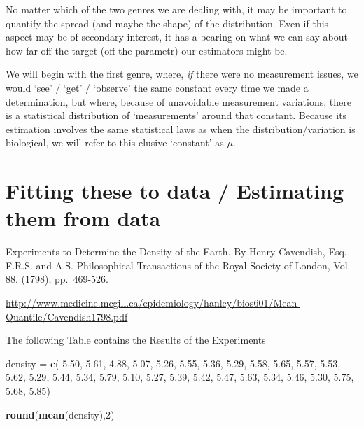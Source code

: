 \documentclass[]{book}
\newenvironment{Shaded}{\begin{snugshade}}{\end{snugshade}}
\newcommand{\DecValTok}[1]{\textcolor[rgb]{0.00,0.00,0.81}{#1}}
\newcommand{\FloatTok}[1]{\textcolor[rgb]{0.00,0.00,0.81}{#1}}
\newcommand{\KeywordTok}[1]{\textcolor[rgb]{0.13,0.29,0.53}{\textbf{#1}}}
\newcommand{\NormalTok}[1]{#1}
\newcommand{\StringTok}[1]{\textcolor[rgb]{0.31,0.60,0.02}{#1}}
\begin{document}
No matter which of the two genres we are dealing with, it may be important to quantify the spread (and maybe the shape) of the distribution. Even if this aspect may be of secondary interest, it has a bearing on what we can say about how far off the target (off the parametr) our estimators might be.

We will begin with the first genre, where, \emph{if} there were no measurement issues, we would `see' / `get' / `observe' the same constant every time we made a determination, but where, because of unavoidable measurement variations, there is a statistical distribution of `measurements' around that constant. Because its estimation involves the same statistical laws as when the distribution/variation is biological, we will refer to this elusive `constant' as \(\mu.\)

\hypertarget{fitting-these-to-data-estimating-them-from-data}{%
\section{Fitting these to data / Estimating them from data}\label{fitting-these-to-data-estimating-them-from-data}}

Experiments to Determine the Density of the Earth. By Henry Cavendish, Esq. F.R.S. and A.S. Philosophical Transactions of the Royal Society of London, Vol. 88. (1798), pp.~469-526.

\url{http://www.medicine.mcgill.ca/epidemiology/hanley/bios601/Mean-Quantile/Cavendish1798.pdf}

The following Table contains the Results of the Experiments

\begin{Shaded}
\begin{Highlighting}[]
\NormalTok{density =}\StringTok{ }\KeywordTok{c}\NormalTok{(}
\FloatTok{5.50}\NormalTok{, }\FloatTok{5.61}\NormalTok{, }\FloatTok{4.88}\NormalTok{, }\FloatTok{5.07}\NormalTok{, }\FloatTok{5.26}\NormalTok{, }\FloatTok{5.55}\NormalTok{, }\FloatTok{5.36}\NormalTok{, }\FloatTok{5.29}\NormalTok{, }\FloatTok{5.58}\NormalTok{, }\FloatTok{5.65}\NormalTok{,}
\FloatTok{5.57}\NormalTok{, }\FloatTok{5.53}\NormalTok{, }\FloatTok{5.62}\NormalTok{, }\FloatTok{5.29}\NormalTok{, }\FloatTok{5.44}\NormalTok{, }\FloatTok{5.34}\NormalTok{, }\FloatTok{5.79}\NormalTok{, }\FloatTok{5.10}\NormalTok{, }\FloatTok{5.27}\NormalTok{, }\FloatTok{5.39}\NormalTok{,}
\FloatTok{5.42}\NormalTok{, }\FloatTok{5.47}\NormalTok{, }\FloatTok{5.63}\NormalTok{, }\FloatTok{5.34}\NormalTok{, }\FloatTok{5.46}\NormalTok{, }\FloatTok{5.30}\NormalTok{, }\FloatTok{5.75}\NormalTok{, }\FloatTok{5.68}\NormalTok{, }\FloatTok{5.85}\NormalTok{)}

\KeywordTok{round}\NormalTok{(}\KeywordTok{mean}\NormalTok{(density),}\DecValTok{2}\NormalTok{)}
\end{Highlighting}
\end{Shaded}
\end{document}
